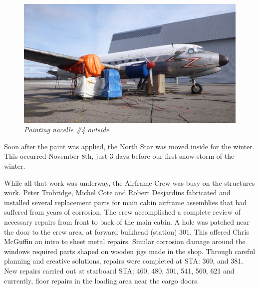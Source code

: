 \begin{figure}[httb]
   \vspace{2em}
   \centering
   \includegraphics [scale=0.5]{nacelle-4-paining-outside-feb-2020.png}
   \caption*{\small \em Painting nacelle \#4 outside}
   \label{fig:wall-two}
\end{figure}

Soon after the paint was
applied, the North Star was moved inside for the winter. This occurred
November 8th, just 3 days before our first snow storm of the winter.

While all that work was underway, the Airframe Crew was busy on the
structures work.  Peter Trobridge, Michel Cote and Robert Desjardins
fabricated and installed several replacement parts for main cabin
airframe assemblies that had suffered from years of corrosion.  The
crew accomplished a complete review of necessary repairs from front to
back of the main cabin. A hole was patched near the door to the crew
area, at forward bulkhead (station) 301. This offered Chris McGuffin an
intro to sheet metal repairs. Similar corrosion damage around the
windows required parts shaped on wooden jigs made in the shop. Through
careful planning and creative solutions, repairs were completed at STA:
360, and 381. New repairs carried out at starboard STA: 460, 480, 501,
541, 560, 621 and currently, floor repairs in the loading area near the
cargo doors.

